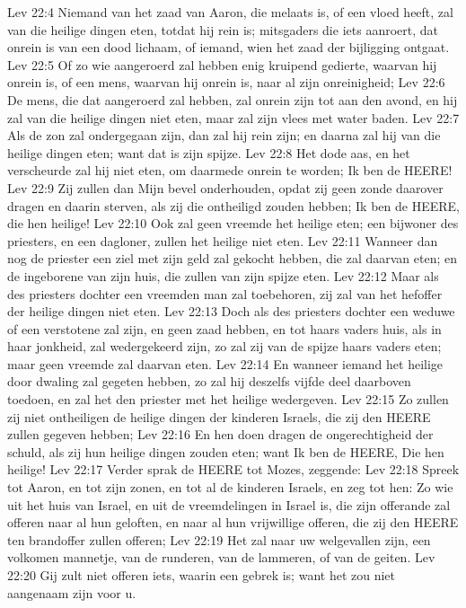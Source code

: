 Lev 22:4  Niemand van het zaad van Aaron, die melaats is, of een vloed heeft, zal van die heilige dingen eten, totdat hij rein is; mitsgaders die iets aanroert, dat onrein is van een dood lichaam, of iemand, wien het zaad der bijligging ontgaat.
Lev 22:5  Of zo wie aangeroerd zal hebben enig kruipend gedierte, waarvan hij onrein is, of een mens, waarvan hij onrein is, naar al zijn onreinigheid;
Lev 22:6  De mens, die dat aangeroerd zal hebben, zal onrein zijn tot aan den avond, en hij zal van die heilige dingen niet eten, maar zal zijn vlees met water baden.
Lev 22:7  Als de zon zal ondergegaan zijn, dan zal hij rein zijn; en daarna zal hij van die heilige dingen eten; want dat is zijn spijze.
Lev 22:8  Het dode aas, en het verscheurde zal hij niet eten, om daarmede onrein te worden; Ik ben de HEERE!
Lev 22:9  Zij zullen dan Mijn bevel onderhouden, opdat zij geen zonde daarover dragen en daarin sterven, als zij die ontheiligd zouden hebben; Ik ben de HEERE, die hen heilige!
Lev 22:10  Ook zal geen vreemde het heilige eten; een bijwoner des priesters, en een dagloner, zullen het heilige niet eten.
Lev 22:11  Wanneer dan nog de priester een ziel met zijn geld zal gekocht hebben, die zal daarvan eten; en de ingeborene van zijn huis, die zullen van zijn spijze eten.
Lev 22:12  Maar als des priesters dochter een vreemden man zal toebehoren, zij zal van het hefoffer der heilige dingen niet eten.
Lev 22:13  Doch als des priesters dochter een weduwe of een verstotene zal zijn, en geen zaad hebben, en tot haars vaders huis, als in haar jonkheid, zal wedergekeerd zijn, zo zal zij van de spijze haars vaders eten; maar geen vreemde zal daarvan eten.
Lev 22:14  En wanneer iemand het heilige door dwaling zal gegeten hebben, zo zal hij deszelfs vijfde deel daarboven toedoen, en zal het den priester met het heilige wedergeven.
Lev 22:15  Zo zullen zij niet ontheiligen de heilige dingen der kinderen Israels, die zij den HEERE zullen gegeven hebben;
Lev 22:16  En hen doen dragen de ongerechtigheid der schuld, als zij hun heilige dingen zouden eten; want Ik ben de HEERE, Die hen heilige!
Lev 22:17  Verder sprak de HEERE tot Mozes, zeggende:
Lev 22:18  Spreek tot Aaron, en tot zijn zonen, en tot al de kinderen Israels, en zeg tot hen: Zo wie uit het huis van Israel, en uit de vreemdelingen in Israel is, die zijn offerande zal offeren naar al hun geloften, en naar al hun vrijwillige offeren, die zij den HEERE ten brandoffer zullen offeren;
Lev 22:19  Het zal naar uw welgevallen zijn, een volkomen mannetje, van de runderen, van de lammeren, of van de geiten.
Lev 22:20  Gij zult niet offeren iets, waarin een gebrek is; want het zou niet aangenaam zijn voor u.
